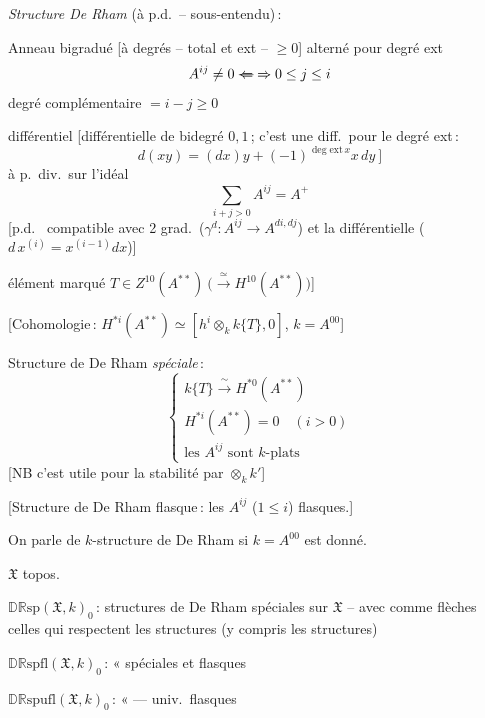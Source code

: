 \documentclass[11pt,a4paper]{article}
\begin{document}

\emph{Structure De Rham} (à p.d.\ -- sous-entendu)\,:

\quad Anneau bigradué [à degrés -- total et ext -- $\geq0$] alterné pour degré
ext
\[
  A^{ij}\neq0\ \text{\struck{$\Leftarrow$}}\Rightarrow 0\leq j\leq i
\]
\quad degré complémentaire $=i-j\geq0$

différentiel [différentielle de bidegré $0,1$\,; c'est une diff.\ pour le
degré ext\,:
\[
  d(xy)=(dx)y+(-1)^{\deg\mathrm{ext}\,x}x\,dy\ ]
\]
à p.\ div.\ sur l'idéal
\[
  \sum_{i+j>0}A^{ij}=A^{+}
\]
[p.d.\ \struck{\ill{}} compatible avec 2 grad.\ ($\gamma^{d}\colon A^{ij}\to
A^{di,dj}$) et la différentielle ($d\,x^{(i)}=x^{(i-1)}dx$)]

élément marqué $T\in Z^{10}(A^{**})\ \bigl(\xrightarrow{\ \simeq\ }H^{10}(A^{**})\bigr)$]

[Cohomologie\,: $H^{*i}(A^{**})\simeq[h^{i}\otimes_{k}k\{T\},0]$, $k=A^{00}$]

Structure de De Rham \emph{spéciale}\,:
\[
  \begin{cases}
    k\{T\}\xrightarrow{\ \sim\ }H^{*0}(A^{**})\\
    H^{*i}(A^{**})=0\quad(i>0)\\
    \text{les } A^{ij}\text{ sont $k$-plats}
  \end{cases}
\]
[NB c'est utile pour la stabilité par $\otimes_{k}k'$]


[Structure de De Rham flasque\,: les $A^{ij}$ ($1\leq i$) flasques.]

On parle de $k$-structure de De Rham si $k=A^{00}$ est donné.

\struck{\ill{}} $\mathfrak{X}$ topos. \struck{\ill{}}

$\mathbb{DR}\mathrm{sp}(\mathfrak{X},k)_{0}$\,: structures de De Rham
spéciales sur $\mathfrak{X}$ -- avec comme flèches celles qui respectent
 les structures (y compris les structures)

$\mathbb{DR}\mathrm{spfl}(\mathfrak{X},k)_{0}$\,: « \quad spéciales et flasques

$\mathbb{DR}\mathrm{spufl}(\mathfrak{X},k)_{0}$\,: « \quad --- \quad univ.\ flasques
\end{document}

